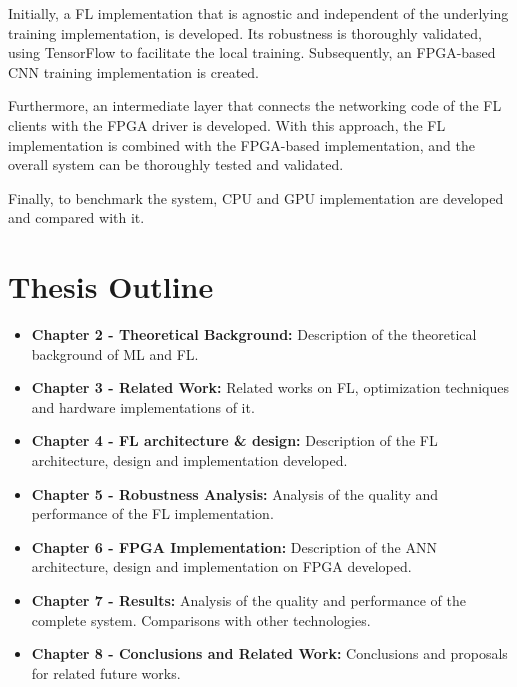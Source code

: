 Initially, a FL implementation that is agnostic and independent of the underlying training implementation, is developed. Its robustness is thoroughly validated, using TensorFlow to facilitate the local training. Subsequently, an FPGA-based CNN training implementation is created. 

Furthermore, an intermediate layer that connects the networking code of the FL clients with the FPGA driver is developed. With this approach, the FL implementation is combined with the FPGA-based implementation, and the overall system can be thoroughly tested and validated.

Finally, to benchmark the system, CPU and GPU implementation are developed and compared with it.

\section{Thesis Outline}
\begin{itemize}
    \item \textbf{Chapter 2 - Theoretical Background:} Description of the theoretical background of ML and FL.
    \item \textbf{Chapter 3 - Related Work:} Related works on FL, optimization techniques and hardware implementations of it.
    \item \textbf{Chapter 4 - FL architecture \& design:} Description of the FL architecture, design and implementation developed.
    \item \textbf{Chapter 5 - Robustness Analysis:} Analysis of the quality and performance of the FL implementation.
    \item \textbf{Chapter 6 - FPGA Implementation:} Description of the ANN architecture, design and implementation on FPGA developed.
    \item \textbf{Chapter 7 - Results:} Analysis of the quality and performance of the complete system. Comparisons with other technologies.
    \item \textbf{Chapter 8 - Conclusions and Related Work:} Conclusions and proposals for related future works.
\end{itemize}